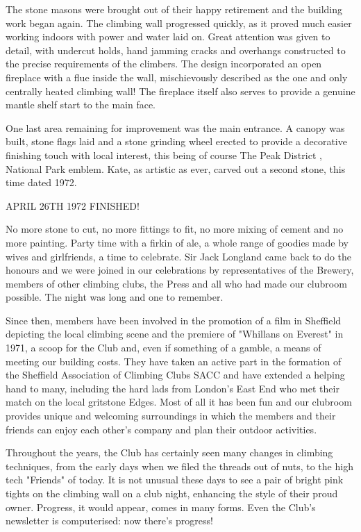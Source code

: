 \documentclass[a5paper,openany,font 10pt]{scrbook}
\begin{document}
The stone masons were brought out of their happy retirement
and the building work began again. The climbing wall progressed
quickly, as it proved much easier working indoors with power and
water laid on.  Great attention was given to detail, with
undercut holds, hand jamming cracks and overhangs constructed to
the precise requirements of the climbers. The design incorporated
an open fireplace with a flue inside the wall, mischievously
described as the one and only centrally heated climbing wall! The
fireplace itself also serves to provide a genuine mantle shelf
start to the main face.

One last area remaining for improvement was the main
entrance. A canopy was built, stone flags laid and a stone
grinding wheel erected to provide a decorative finishing touch
with local interest, this being of course The Peak District ,
 National Park emblem. Kate, as artistic as ever, carved out a
second stone, this time dated 1972.

APRIL 26TH 1972   FINISHED!

No more stone to cut, no more fittings to fit, no more
mixing of cement and no more painting. Party time with a firkin
of ale, a whole range of goodies made by wives and girlfriends, a
time to celebrate. Sir Jack Longland came back to do the honours
and we were joined in our celebrations by representatives of the
Brewery, members of other climbing clubs, the Press and all who
had made our clubroom possible. The night was long and one to
remember.

Since then, members have been involved in the promotion of a
film in Sheffield depicting the local climbing scene and the
premiere of "Whillans on Everest" in 1971, a scoop for the Club
and, even if something of a gamble, a means of meeting our
building costs. They have taken an active part in the formation
of the Sheffield Association of Climbing Clubs  SACC  and have
extended a helping hand to many, including the hard lads from
London's East End who met their match on the local gritstone
Edges. Most of all it has been fun and our clubroom provides
unique and welcoming surroundings in which the members and their
friends can enjoy each other's company and plan their outdoor
activities.

Throughout the years, the Club has certainly seen many
changes in climbing techniques, from the early days when we filed
the threads out of nuts, to the high tech "Friends" of today. It
is not unusual these days to see a pair of bright pink tights on
the climbing wall on a club night, enhancing the style of their
proud owner. Progress, it would appear, comes in many forms. Even
the Club's newsletter is computerised: now there's progress!
\end{document}
